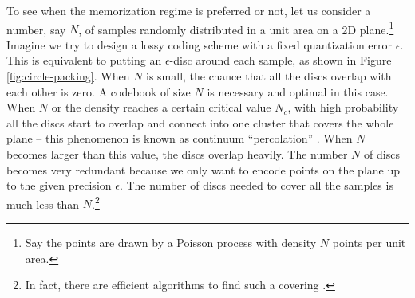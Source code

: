 \documentclass[../../book-main.tex]{subfiles}
\begin{document}
\begin{example}
	To see when the memorization regime is preferred or not, let us consider a number, say $N$, of samples randomly distributed in a unit area on a 2D plane.\footnote{Say the points are drawn by a Poisson process with density $N$ points per unit area.} Imagine we try to design a lossy coding scheme with a fixed quantization error $\epsilon$. This is equivalent to putting an $\epsilon$-disc around each sample, as shown in Figure \ref{fig:circle-packing}. When $N$ is small, the chance that all the discs overlap with each other is zero. A codebook of size $N$ is necessary and optimal in this case. When $N$ or the density reaches a certain critical value $N_c$, with high probability all the discs start to overlap and connect into one cluster that covers the whole plane -- this phenomenon is known as continuum ``percolation'' \cite{Gilbert-1961,Mertens-Moore-2012}. When $N$ becomes larger than this value, the discs overlap heavily. The number $N$ of discs becomes very redundant because we only want to encode points on the plane up to the given precision $\epsilon$. The number of discs needed to cover all the samples is much less than $N$.\footnote{In fact, there are efficient algorithms to find such a covering \cite{Booth-2001}.}
\end{example}
\end{document}
